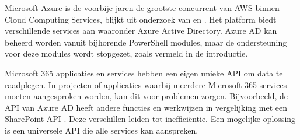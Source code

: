 \begin{comment}
Azure biedt ondersteuning aan voor verschillende niet Microsoft-gerelateerde Infrastructure Automation tools. Configuration Management tools zoals Ansible, Chef en Puppet werden al onderzocht en onderling vergeleken in andere studies \autocite{Microsoft2022a}. 

Ansible biedt goede ondersteuning aan op \newline lange termijn en is simpel in gebruik met goede documentatie. Daarnaast is Ansible een krachtige tool met veel potentieel \autocite{Masek2018}. Het wordt eerder aangeraden voor kleinere projecten door zijn onvolledigheid. Waarbij Chef en Puppet meer compleet zijn en grote projecten beter kan verwerken \autocite{Bertram2016}. 

Naast bovenstaande tools ondersteunt Azure Orchestration tools waaronder Terraform. Deze tool is onveranderlijk ten opzichte van Configuration Management tools. Terraform wordt gebruikt om machines te orkestreren wat eenvoudiger is om meerdere instanties te voorzien. Terwijl Configuration Management tools zich focussen op het configureren van instanties \autocite{Brikman2016}.

Binnen Hogeschool Gent zijn er reeds een aantal studies uitgevoerd naar aspecten die voorkomen in dit onderwerp. Kelvin \textcite{Vermeulen2021} heeft een onderzoek uitgevoerd naar het automatiseren van een Public Cloud-omgeving binnen AWS. Daarnaast heeft Joachim \textcite{VandeKeere2021} een studie uitgevoerd naar het gebruik van Ansible binnen lokale omgevingen. 

In het eerste onderzoek van Vermeulen werd de configuratie van AWS manueel uitgevoerd. Vervolgens werd in het tweede onderzoek van Van der Keere Ansible gebruikt voor een lokale \newline Windows- en Linux-omgeving. In deze studie worden de configuraties van Azure geautomatiseerd. Verder wordt er een Linux-testomgeving opgezet in de Cloud via Ansible.

\end{comment}

Microsoft Azure is de voorbije jaren de grootste concurrent van AWS binnen Cloud Computing Services, blijkt uit onderzoek van \textcite{Vailshery2022} en \textcite{SRG2022}. Het platform biedt verschillende services aan waaronder Azure Active Directory. Azure AD kan beheerd worden vanuit bijhorende PowerShell modules, maar de ondersteuning voor deze modules wordt stopgezet, zoals vermeld in de introductie. 

Microsoft 365 applicaties en services hebben een eigen unieke API om data te raadplegen. In projecten of applicaties waarbij meerdere Microsoft 365 services moeten aangesproken worden, kan dit voor problemen zorgen. Bijvoorbeeld, de API van Azure AD heeft andere functies en werkwijzen in vergelijking met een SharePoint API \autocite{VanRousselt2021}. Deze verschillen leiden tot inefficiëntie. Een mogelijke oplossing is een universele API die alle services kan aanspreken.


